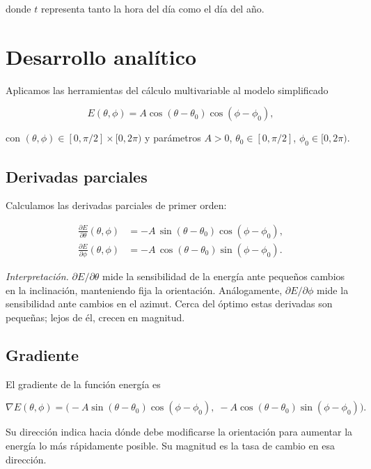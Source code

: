 \documentclass[12pt,a4paper]{article}
\begin{document}
donde $t$ representa tanto la hora del día como el día del año.

\section{Desarrollo analítico}

Aplicamos las herramientas del cálculo multivariable al modelo simplificado

\[
E(\theta,\phi)=A\cos(\theta-\theta_0)\cos(\phi-\phi_0),
\]

con $(\theta,\phi)\in[0,\pi/2]\times[0,2\pi)$ y parámetros $A>0$, $\theta_0\in[0,\pi/2]$, $\phi_0\in[0,2\pi)$.

\subsection{Derivadas parciales}

Calculamos las derivadas parciales de primer orden:

\begin{align}
\frac{\partial E}{\partial\theta}(\theta,\phi)
&= -A\,\sin(\theta-\theta_0)\cos(\phi-\phi_0), \label{eq:dEdt}\\[4pt]
\frac{\partial E}{\partial\phi}(\theta,\phi)
&= -A\,\cos(\theta-\theta_0)\sin(\phi-\phi_0). \label{eq:dEdp}
\end{align}

\noindent\textit{Interpretación.} $\partial E/\partial\theta$ mide la sensibilidad de la energía ante pequeños cambios en la inclinación, manteniendo fija la orientación. Análogamente, $\partial E/\partial\phi$ mide la sensibilidad ante cambios en el azimut. Cerca del óptimo estas derivadas son pequeñas; lejos de él, crecen en magnitud.

\subsection{Gradiente}

El gradiente de la función energía es

\begin{equation}\label{eq:grad}
\nabla E(\theta,\phi)=\big(
-A\sin(\theta-\theta_0)\cos(\phi-\phi_0),\;
-A\cos(\theta-\theta_0)\sin(\phi-\phi_0)
\big).
\end{equation}

Su dirección indica hacia dónde debe modificarse la orientación para aumentar la energía lo más rápidamente posible. Su magnitud es la tasa de cambio en esa dirección.
\end{document}

